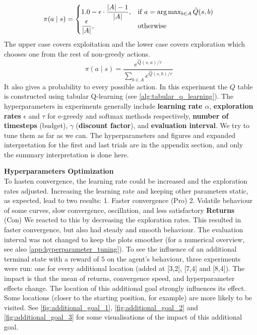 \documentclass{article}
\theoremstyle{plain}
\theoremstyle{definition}
\theoremstyle{remark}
\begin{document}
\vspace{-7mm}
\begin{equation}
\pi(a \mid s)=
\begin{cases}
1.0 - \epsilon \cdot \dfrac{|A|-1}{|A|}, 
& \text{if } a=\arg\max_{b\in A}\hat{Q}(s,b) \\
\dfrac{\epsilon}{|A|}, 
& \text{otherwise}
\end{cases}
\label{eq:epsilon_greedy}
\vspace{-2mm}
\end{equation}
The upper case covers exploitation and the lower case covers exploration which chooses one from the rest of non-greedy actions.
\begin{equation}
\pi(a \mid s)=
\frac{e^{\hat{Q}(s,a)/\tau}}
{\sum_{b\in A} e^{\hat{Q}(s,b)/\tau}}
\label{eq:boltzmann}
\end{equation}
 It also gives a probability to every possible action. In this experiment the $Q$ table is constructed using tabular Q-learning (see \autoref{alg:tabular_q_learning}). 
The hyperparameters in experiments generally include \textbf{learning rate $\alpha$}, \textbf{exploration rates} $\epsilon$ and $\tau$ for e-greedy and softmax methods respectively, \textbf{number of timesteps} (budget), $\gamma$ (\textbf{discount factor}), and \textbf{evaluation interval}. We try to tune them as far as we can. The hyperparameters and figures and expanded interpretation for the first and last trials are in the appendix section, and only the summary interpretation is done here.

\textbf{Hyperparameters Optimization}  \\
To hasten convergence, the learning rate could be increased and the exploration rates adjusted.
Increasing the learning rate and keeping other parameters static, as expected, lead to two results:
1. Faster convergence (Pro)
2. Volatile behaviour of some curves, slow convergence, oscillation, and less satisfactory \textbf{Returns} (Con)
We reacted to this by decreasing the exploration rates. This resulted in faster convergence, but also had steady and smooth behaviour. The evaluation interval was not changed to keep the plots smoother (for a numerical overview, see also \autoref{app:hyperparameter_tuning}).
To see the influence of an additional terminal state with a reward of $5$ on the agent's behaviour, three experiments were run: one for every additional location (added at [3,2], [7,4] and [8,4]). The impact is that the mean of returns, convergence speed, and hyperparameter effects change. The location of this additional goal strongly influences its effect. Some locations (closer to the starting position, for example) are more likely to be visited. See \autoref{fig:additional_goal_1}, \autoref{fig:additional_goal_2} and \autoref{fig:additional_goal_3} for some visualisations of the impact of this additional goal.
\end{document}
